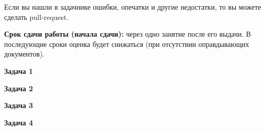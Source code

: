 Если вы нашли в задачнике ошибки, опечатки и другие недостатки, то вы можете сделать pull-request. 

\textbf{Срок сдачи работы (начала сдачи):} через одно занятие после его выдачи. В последующие сроки оценка будет снижаться (при отсутствии оправдывающих документов).


\textbf{Задача 1}



\textbf{Задача 2}



\textbf{Задача 3}



\textbf{Задача 4}

